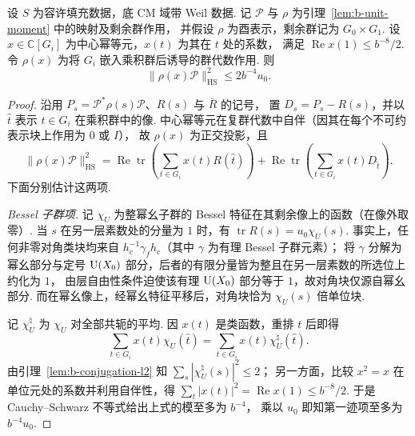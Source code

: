 \begin{lemma}[单个层素数处的投影估计]
\label{lem:b-one-level-moment}
\emitthmsource
设 $S$ 为容许填充数据，底 CM 域带 Weil 数据.
记 $\mathcal P$ 与 $\rho$ 为引理~\ref{lem:b-unit-moment} 中的映射及剩余群作用，
并假设 $\rho$ 为酉表示，剩余群记为 $G_0\times G_1$.
设 $x\in\mathbb C[G_i]$ 为中心幂等元，$x(t)$ 为其在 $t$ 处的系数，
满足 $\operatorname{Re} x(1)\le b^{-8}/2$.
令 $\rho(x)$ 为将 $G_i$ 嵌入乘积群后诱导的群代数作用. 则
\[
 \|\rho(x)\mathcal P\|_{\mathrm{HS}}^2\le 2b^{-4}u_0.
\]
\end{lemma}
\begin{proof}
沿用 $P_s=\mathcal P^*\rho(s)\mathcal P$、$R(s)$ 与 $\overline R$ 的记号，
置 $D_s=P_s-R(s)$，并以 $\widehat t$ 表示 $t\in G_i$ 在乘积群中的像.
中心幂等元在复群代数中自伴（因其在每个不可约表示块上作用为 $0$ 或 $I$），
故 $\rho(x)$ 为正交投影，且
\[
 \|\rho(x)\mathcal P\|_{\mathrm{HS}}^2
 =\operatorname{Re}\operatorname{tr}
       \left(\sum_{t\in G_i}x(t)R(\widehat t)\right)
  +\operatorname{Re}\operatorname{tr}
       \left(\sum_{t\in G_i}x(t)D_{\widehat t}\right).
\]
下面分别估计这两项.

\emph{Bessel 子群项.}
记 $\chi_U$ 为整幂幺子群的 Bessel 特征在其剩余像上的函数（在像外取零）.
当 $s$ 在另一层素数处的分量为 $1$ 时，有
$\operatorname{tr}R(s)=u_0\chi_U(s)$.
事实上，任何非零对角类块均来自 $h_c^{-1}\gamma_f h_c$（其中 $\gamma$ 为有理 Bessel 子群元素）；
将 $\gamma$ 分解为幂幺部分与定号
$\operatorname{U}(X_0)$ 部分，后者的有限分量皆为整且在另一层素数的所选位上约化为 $1$，
由层自由性条件迫使该有理 $\operatorname{U}(X_0)$ 部分等于 $1$，故对角块仅源自幂幺部分.
而在幂幺像上，经幂幺特征平移后，对角块恰为 $\chi_U(s)$ 倍单位块.

记 $\chi_U^\natural$ 为 $\chi_U$ 对全部共轭的平均.
因 $x(t)$ 是类函数，重排 $t$ 后即得
\[
 \sum_{t\in G_i}x(t)\chi_U(\widehat t)
 =\sum_{t\in G_i}x(t)\chi_U^\natural(\widehat t).
\]
由引理~\ref{lem:b-conjugation-l2} 知 $\sum_s|\chi_U^\natural(s)|^2\le 2$；
另一方面，比较 $x^2=x$ 在单位元处的系数并利用自伴性，得
$\sum_t|x(t)|^2=\operatorname{Re}x(1)\le b^{-8}/2$.
于是 Cauchy--Schwarz 不等式给出上式的模至多为 $b^{-4}$，
乘以 $u_0$ 即知第一迹项至多为 $b^{-4}u_0$.


\end{proof}
